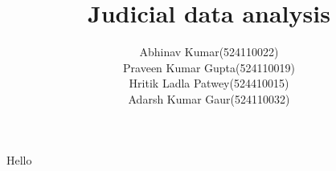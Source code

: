 \documentclass[11pt, a4paper]{report}
\title{\textbf{Judicial data analysis}}
\author{Abhinav Kumar(524110022) \\ Praveen Kumar Gupta(524110019) \\ Hritik Ladla Patwey(524410015) \\ Adarsh Kumar Gaur(524110032)}
\begin{document}
\maketitle
Hello
\end{document}
